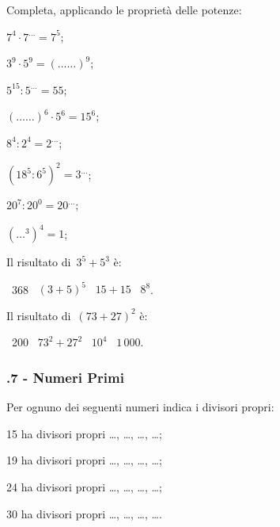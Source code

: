 \pagebreak
\begin{esercizio}
\label{ese:1.12}
 Completa, applicando le proprietà delle potenze:
\begin{multicols}{2}
 \begin{enumeratea}
 \item $7^4\cdot7^{\ldots}=7^5$;
 \item $3^9\cdot5^9=(\ldots\ldots)^9$;
 \item $5^{15}:5^{\ldots}=55$;
 \item $(\ldots\ldots)^6\cdot5^6=15^6$;
 \item $8^4:2^4=2^{\ldots}$;
 \item $\left(18^5:6^5\right)^2=3^{\ldots}$;
 \item $20^7:20^0=20^{\ldots}$;
 \item $\left(\ldots^3\right)^4=1$;
 \end{enumeratea}
\end{multicols}
\end{esercizio}

\begin{esercizio}
\label{ese:1.13}
 Il risultato di~$3^5+5^3$ è:
 \begin{center}
 \boxA\:~368 \quad\boxB\:~$(3+5)^5$ \quad\boxC\:~$15+15$ \quad\boxD\:~$8^8$.
 \end{center}
\end{esercizio}

\begin{esercizio}
\label{ese:1.14}
 Il risultato di~$(73+27)^2$ è:
 \begin{center}
 \boxA\:~200 \quad\boxB\:~$73^2+27^2$ \quad\boxC\:~$10^4$ \quad\boxD\:~$1\,000$.
 \end{center}
\end{esercizio}

\subsubsection*{\thechapter.7 - Numeri Primi}
\begin{esercizio}
\label{ese:1.15}
 Per ognuno dei seguenti numeri indica i divisori propri:
  \begin{multicols}{2}
 \begin{enumeratea}
 \item 15 ha divisori propri \ldots, \ldots, \ldots, \ldots;
 \item 19 ha divisori propri \ldots, \ldots, \ldots, \ldots;
 \item 24 ha divisori propri \ldots, \ldots, \ldots, \ldots;
 \item 30 ha divisori propri \ldots, \ldots, \ldots, \ldots.
 \end{enumeratea}
  \end{multicols}
\end{esercizio}

